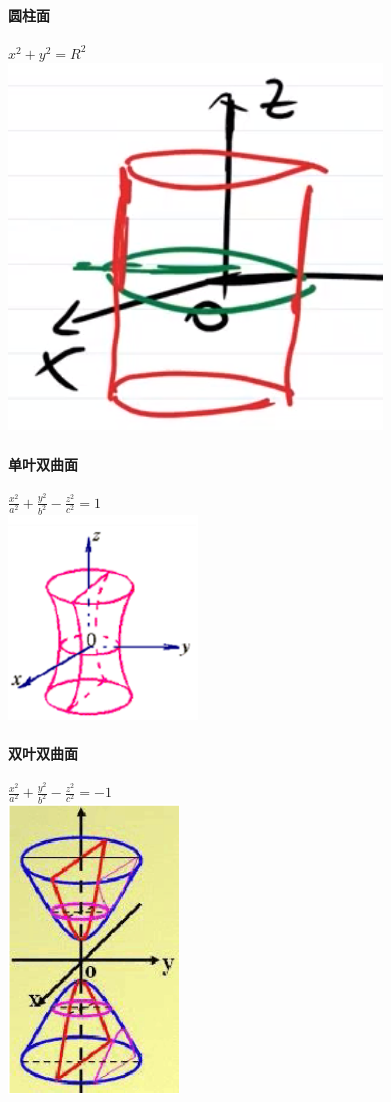 \documentclass{article}
\begin{document}
\begin{flushleft}
	\paragraph{圆柱面}
	$x^2+y^2=R^2$\\
	\includegraphics[scale=0.5]{yz.png}
	
	\paragraph{单叶双曲面}
	$\frac{x^2}{a^2}+\frac{y^2}{b^2}-\frac{z^2}{c^2}=1$\\
	\includegraphics[scale=0.5]{dysqm.png}
	
	\paragraph{双叶双曲面}
	$\frac{x^2}{a^2}+\frac{y^2}{b^2}-\frac{z^2}{c^2}=-1$\\
	\includegraphics[scale=0.5]{sysqm.png}
	

\end{flushleft}
\end{document}
